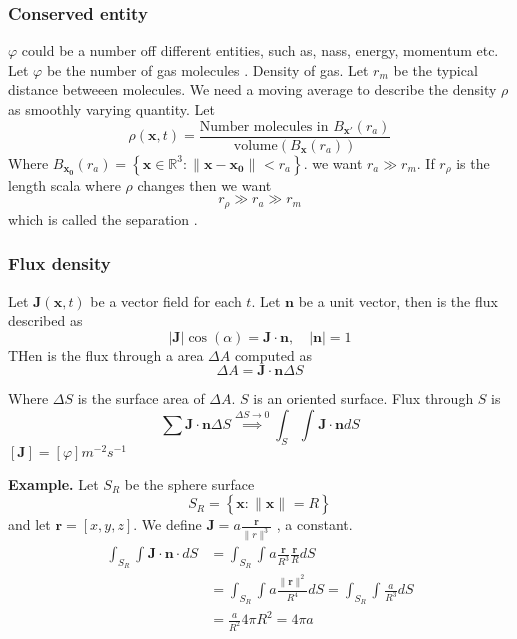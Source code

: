 \documentclass{article}
\theoremstyle{remark}
\begin{document}
\subsubsection{Conserved entity}%
\label{ssub:conserved_entity_e}

$\varphi $ could be a number off different entities, such as, nass, energy, momentum etc.  Let $\varphi $ be the number of gas molecules . Density of gas. Let $r_{m}$ be the typical distance betweeen molecules. We need a moving average to describe the density $\rho $ as smoothly varying quantity. Let \[
\rho \left( \mathbf{x},t \right) = \frac{\text{Number molecules in } B_{\mathbf{x}' }\left( r_{a} \right)}{\text{volume} \left( B_{\mathbf{x}}\left( r_{a} \right) \right)} 
\] 
Where $B_{\mathbf{x_{0}}}\left( r_{a} \right) = \left\{ \mathbf{x}\in \mathbb{R} ^3: \|\mathbf{x} - \mathbf{x_{0}}\|_{}^{} < r_{a} \right\}$. we want $r_{a}\gg  r_{m}$. If $r_{\rho }$ is the length scala where $\rho $ changes then we want \[
r_{\rho } \gg  r_{a} \gg  r_{m}
\] 
which is called the separation .

\subsubsection{Flux density}%
\label{ssub:flux_density}

Let $\mathbf{J} \left( \mathbf{x} , t \right)$ be a vector field for each $t$. Let $\mathbf{n}$ be a unit vector, then is the flux described as \[
\left\lvert \mathbf{J} \right\rvert  \cos \left( \alpha  \right) = \mathbf{J}\cdot \mathbf{n}, \quad   \left\lvert \mathbf{n} \right\rvert  = 1 
\]  
THen is the flux through a area $\Delta A$ computed as \[
\Delta A = \mathbf{J}\cdot \mathbf{n} \Delta S
\] 

Where $\Delta S$ is the surface area of $\Delta A$. $S $ is an oriented surface. Flux through $S$ is \[
\sum_{}^{} \mathbf{J}\cdot  \mathbf{n} \Delta S  \stackrel{\Delta S \to  0}{\implies   }  \int_{S}^{} \int_{}^{}  \mathbf{J} \cdot \mathbf{n} dS  
\] 
$\left[ \mathbf{J} \right]  = \left[ \varphi  \right] m^{-2}s^{-1}$

\begin{tcolorbox}
  \textbf{Example.} Let $S_{R}$ be the sphere surface \[
  S_{R} = \left\{ \mathbf{x} : \|\mathbf{x}\|_{}^{} =R \right\}
  \] 
  and let $\mathbf{r} = \left[ x,y,z \right]$. We define $\mathbf{J} = a \frac{\mathbf{r}}{ \|r\|_{}^{3}} $ , a constant. \[
    \begin{split}
  \int_{S_{R}}^{}  \int_{}^{}  \mathbf{J} \cdot \mathbf{n}\cdot    dS  & = \int_{S_{R}}^{}  \int_{}^{}    a \frac{\mathbf{r}}{R^{3}}  \frac{\mathbf{r}}{R}  dS   \\
  &= \int_{S_{R}}^{}  \int_{}^{}  a \frac{\|\mathbf{r}\|_{}^{2} }{R^{4}} dS = \int_{S_{R}}^{}  \int_{}^{}  \frac{a}{R^{3}} dS    \\
  &=  \frac{a}{R^{2}} 4 \pi R^{2} = 4 \pi  a \\
    \end{split} 
  \] 
\end{tcolorbox}
\end{document}
